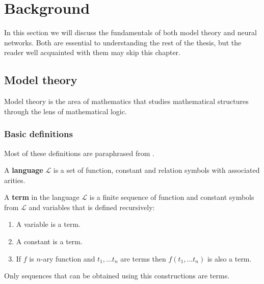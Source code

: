 \chapter{Background}
In this section we will discuss the fundamentals of both model theory and neural networks. Both are essential to understanding the rest of the thesis, but the reader well acquainted with them may skip this chapter.


\section{Model theory}
Model theory is the area of mathematics that studies mathematical structures through the lens of mathematical logic.
\subsection{Basic definitions}
Most of these definitions are paraphrased from \cite{model}.
\begin{defn} A \textbf{language} $\mathcal{L}$ is a set of function, constant and relation symbols with associated arities.
\end{defn}

\begin{defn} A \textbf{term} in the language $\mathcal{L}$ is a finite sequence of function and constant symbols from $\mathcal{L}$ and variables that is defined recursively:
	\begin{enumerate}
	\item A variable is a term.
	\item A constant is a term.
	\item If $f$ is $n$-ary function and $t_1, \dots t_n$ are terms then $f(t_1, \dots t_n)$ is also a term.
	\end{enumerate}
Only sequences that can be obtained using this constructions are terms.
\end{defn}

